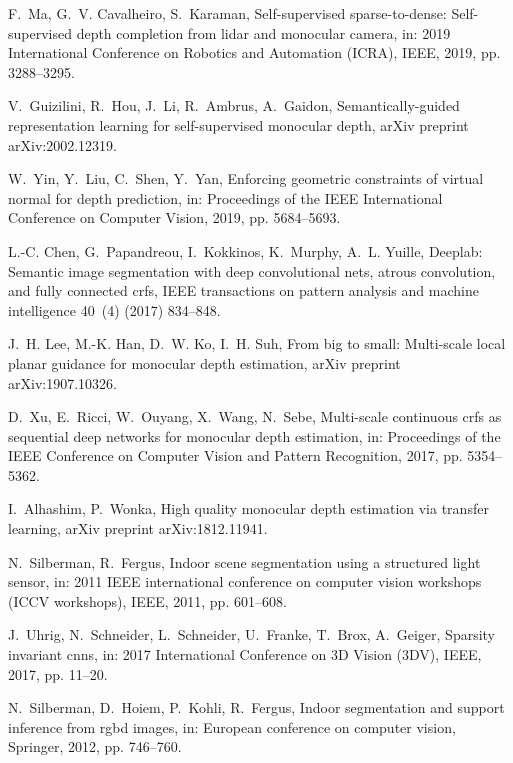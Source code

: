 \documentclass[5p]{elsarticle}
\begin{document}
\begin{thebibliography}{100}
F.~Ma, G.~V. Cavalheiro, S.~Karaman, Self-supervised sparse-to-dense:
  Self-supervised depth completion from lidar and monocular camera, in: 2019
  International Conference on Robotics and Automation (ICRA), IEEE, 2019, pp.
  3288--3295.

V.~Guizilini, R.~Hou, J.~Li, R.~Ambrus, A.~Gaidon, Semantically-guided
  representation learning for self-supervised monocular depth, arXiv preprint
  arXiv:2002.12319.

W.~Yin, Y.~Liu, C.~Shen, Y.~Yan, Enforcing geometric constraints of virtual
  normal for depth prediction, in: Proceedings of the IEEE International
  Conference on Computer Vision, 2019, pp. 5684--5693.

L.-C. Chen, G.~Papandreou, I.~Kokkinos, K.~Murphy, A.~L. Yuille, Deeplab:
  Semantic image segmentation with deep convolutional nets, atrous convolution,
  and fully connected crfs, IEEE transactions on pattern analysis and machine
  intelligence 40~(4) (2017) 834--848.

J.~H. Lee, M.-K. Han, D.~W. Ko, I.~H. Suh, From big to small: Multi-scale local
  planar guidance for monocular depth estimation, arXiv preprint
  arXiv:1907.10326.

D.~Xu, E.~Ricci, W.~Ouyang, X.~Wang, N.~Sebe, Multi-scale continuous crfs as
  sequential deep networks for monocular depth estimation, in: Proceedings of
  the IEEE Conference on Computer Vision and Pattern Recognition, 2017, pp.
  5354--5362.

I.~Alhashim, P.~Wonka, High quality monocular depth estimation via transfer
  learning, arXiv preprint arXiv:1812.11941.

N.~Silberman, R.~Fergus, Indoor scene segmentation using a structured light
  sensor, in: 2011 IEEE international conference on computer vision workshops
  (ICCV workshops), IEEE, 2011, pp. 601--608.

J.~Uhrig, N.~Schneider, L.~Schneider, U.~Franke, T.~Brox, A.~Geiger, Sparsity
  invariant cnns, in: 2017 International Conference on 3D Vision (3DV), IEEE,
  2017, pp. 11--20.

N.~Silberman, D.~Hoiem, P.~Kohli, R.~Fergus, Indoor segmentation and support
  inference from rgbd images, in: European conference on computer vision,
  Springer, 2012, pp. 746--760.


\end{thebibliography}
\end{document}
